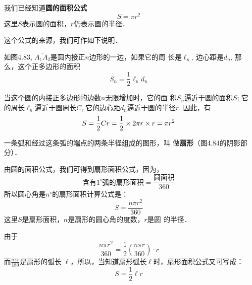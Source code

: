 我们已经知道\textbf{圆的面积公式}
\[S=\pi r^2\]
这里$S$表示圆的面积，$r$仍表示圆的半径．

这个公式的来源，我们可作如下说明．

如图4.83, $\overline{A_1A_2}$是圆内接正$n$边形的一边，如果它的周
长是$\ell_n$, 边心距是$d_n$, 
那么，这个正多边形的面积
\[S_n=\frac{1}{2}\ell_nd_n\]

当这个圆的内接正多边形的边数$n$无限增加时，它的面
积$S_n$逼近于圆的面积$S$; 它的周长$\ell_n$逼近于圆周长$C$, 
它的边心距$d_n$逼近于圆的半径$r$. 因此，有
\[S=\dfrac{1}{2}Cr=\dfrac{1}{2}\times 2\pi r\times r=\pi r^2\]

一条弧和经过这条弧的端点的两条半径组成的图形，叫
做\textbf{扇形}（图4.84的阴影部分）．

\begin{figure}[htp]\centering
  \begin{minipage}[t]{0.48\textwidth}
  \centering
{}
  \caption{}
  \end{minipage}
  \begin{minipage}[t]{0.48\textwidth}
  \centering
  \caption{}
  \end{minipage}
  \end{figure}

由圆的面积公式，我们可得到扇形面积公式，因为，
\[\text{含有$1^{\circ}$弧的扇形面积}=\frac{\text{圆面积}}{360}\]
所以圆心角是$n^{\circ}$的扇形面积计算公式是：
\[S=\frac{n\pi r^2}{360}\]
这里$S$是扇形面积，$n$是扇形的圆心角的度数，$r$是圆
的半径．

由于
\[\frac{n\pi r^2}{360}=\frac{1}{2}\left(\frac{n\pi r}{360}\right)\cdot r\]
而$\frac{n\pi r}{180}$是扇形的弧长
$\ell$，所以，当知道扇形弧长$\ell$时，扇形面积公式又可写成：
\[S=\frac{1}{2}\ell r\]

